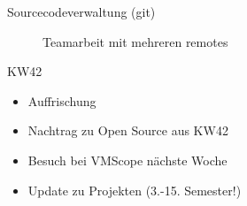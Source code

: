 \begin{frame}{Sourcecodeverwaltung (git)}
    \begin{minipage}{.4\textwidth}
        \begin{figure}[h!]
            \caption{Teamarbeit mit mehreren remotes \cite{gitbranching}}
        \end{figure}
    \end{minipage}
\end{frame}

\begin{frame}{KW42}
    \begin{itemize}
        \item Auffrischung
        \item<2-> Nachtrag zu Open Source aus KW42
	\item<3-> Besuch bei VMScope nächste Woche
        \item<4-> Update zu Projekten (3.-15. Semester!)
    \end{itemize}
\end{frame}

